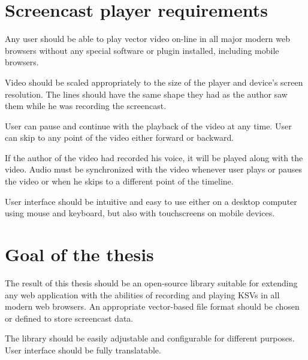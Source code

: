 \section{Screencast player requirements}
Any user should be able to play vector video on-line in all major modern web browsers without any special software or plugin installed, including mobile browsers.

Video should be scaled appropriately to the size of the player and device's screen resolution. The lines should have the same shape they had as the author saw them while he was recording the screencast.

User can pause and continue with the playback of the video at any time. User can skip to any point of the video either forward or backward.

If the author of the video had recorded his voice, it will be played along with the video. Audio must be synchronized with the video whenever user plays or pauses the video or when he skips to a different point of the timeline.

User interface should be intuitive and easy to use either on a desktop computer using mouse and keyboard, but also with touchscreens on mobile devices.

\section{Goal of the thesis}

The result of this thesis should be an open-source library suitable for extending any web application with the abilities of recording and playing KSVs in all modern web browsers. An appropriate vector-based file format should be chosen or defined to store screencast data.

The library should be easily adjustable and configurable for different purposes. User interface should be fully translatable.